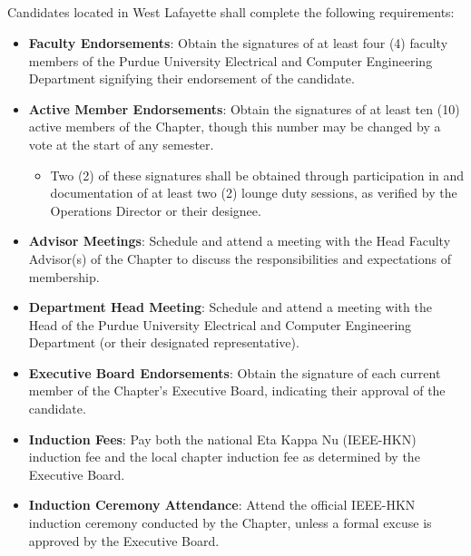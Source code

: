 \documentclass[10pt, oneside]{article}
\begin{document}
\subsection{ }
Candidates located in West Lafayette shall complete the following requirements:
\begin{itemize}
    \item \textbf{Faculty Endorsements}: Obtain the signatures of at least four (4) faculty members of the Purdue University Electrical and Computer Engineering Department signifying their endorsement of the candidate.
    \item \textbf{Active Member Endorsements}: Obtain the signatures of at least ten (10) active members of the Chapter, though this number may be changed by a vote at the start of any semester.
    \begin{itemize}
        \item Two (2) of these signatures shall be obtained through participation in and documentation of at least two (2) lounge duty sessions, as verified by the Operations Director or their designee.
    \end{itemize}
    \item \textbf{Advisor Meetings}: Schedule and attend a meeting with the Head Faculty Advisor(s) of the Chapter to discuss the responsibilities and expectations of membership.
    \item \textbf{Department Head Meeting}: Schedule and attend a meeting with the Head of the Purdue University Electrical and Computer Engineering Department (or their designated representative).
    \item \textbf{Executive Board Endorsements}: Obtain the signature of each current member of the Chapter's Executive Board, indicating their approval of the candidate.
    \item \textbf{Induction Fees}: Pay both the national Eta Kappa Nu (IEEE-HKN) induction fee and the local chapter induction fee as determined by the Executive Board.
    \item \textbf{Induction Ceremony Attendance}: Attend the official IEEE-HKN induction ceremony conducted by the Chapter, unless a formal excuse is approved by the Executive Board.
\end{itemize}
\end{document}
